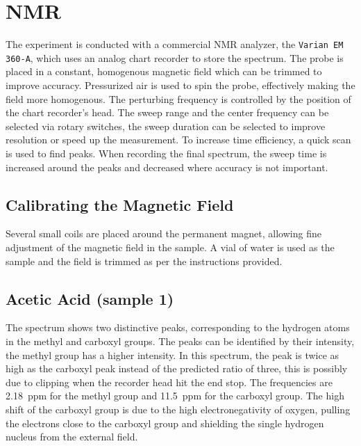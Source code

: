 \chapter{NMR}
The experiment is conducted with a commercial NMR analyzer, the \texttt{Varian EM 360-A}, which uses an analog chart recorder to store the spectrum.
The probe is placed in a constant, homogenous magnetic field which can be trimmed to improve accuracy.
Pressurized air is used to spin the probe, effectively making the field more homogenous. %
The perturbing frequency is controlled by the position of the chart recorder's head.
The sweep range and the center frequency can be selected via rotary switches, the sweep duration can be selected to improve resolution or speed up the measurement.
To increase time efficiency, a quick scan is used to find peaks.
When recording the final spectrum, the sweep time is increased around the peaks and decreased where accuracy is not important.

\section{Calibrating the Magnetic Field}
Several small coils are placed around the permanent magnet, allowing fine adjustment of the magnetic field in the sample.
A vial of water is used as the sample and the field is trimmed as per the instructions provided.


\section{Acetic Acid (sample 1)}
The spectrum shows two distinctive peaks, corresponding to the hydrogen atoms in the methyl and carboxyl groups.
The peaks can be identified by their intensity, the methyl group has a higher intensity.
In this spectrum, the peak is twice as high as the carboxyl peak instead of the predicted ratio of three, this is possibly due to clipping when the recorder head hit the end stop.
The frequencies are \SI{2.18}{ppm} for the methyl group and \SI{11.5}{ppm} for the carboxyl group.
The high shift of the carboxyl group is due to the high electronegativity of oxygen, pulling the electrons close to the carboxyl group and shielding the single hydrogen nucleus from the external field.


